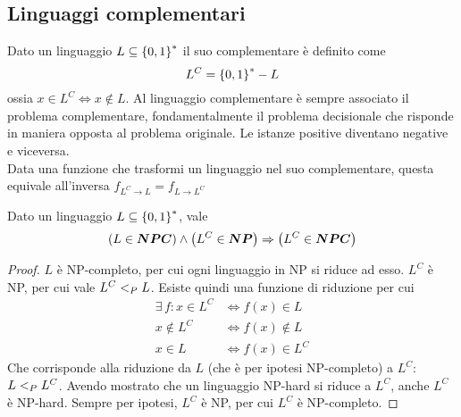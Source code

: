 \subsection{Linguaggi complementari}
\begin{definition}
    \label{def:linguaggiocomplementare}
    Dato un linguaggio $
    L \subseteq \left\{0,1\right\}^{*}
    $
    il suo complementare è definito come
    \begin{equation*}
        L^C = \left\{0,1\right\}^{*} - L
    \end{equation*}
    ossia
    $
        x \in L^C \Leftrightarrow x \notin L
    $.
    Al linguaggio complementare è sempre associato il problema complementare, fondamentalmente il problema decisionale che risponde in maniera opposta al problema originale. Le istanze positive diventano negative e viceversa.
    \\
    Data una funzione che trasformi un linguaggio nel suo complementare, questa equivale all'inversa
    $
        f_{L^C \to L}
        =
        f_{L \to L^C}
    $
\end{definition}

\begin{theorem}
    \label{teo:riduzionecomplementare}
    Dato un linguaggio $
    L \subseteq \left\{0,1\right\}^{*}
    $,
    vale
    \begin{equation*}
        \left( L \in \bm{NPC} \right)
        \wedge
        \left( L^C \in \bm{NP} \right)
        \Rightarrow
        \left( L^C \in \bm{NPC} \right)
    \end{equation*}
    \begin{proof}
        $L$ è NP-completo, per cui ogni linguaggio in NP si riduce ad esso. $L^C$ è NP, per cui vale $L^C <_P L$.
        Esiste quindi una funzione di riduzione per cui
        \begin{align*}
            \exists \, f :
            x \in L^C
            & \Leftrightarrow
            f(x) \in L
            \\
            x \notin L^C
            & \Leftrightarrow
            f(x) \notin L
            \\
            x \in L
            & \Leftrightarrow
            f(x) \in L^C
        \end{align*}
        Che corrisponde alla riduzione da $L$ (che è per ipotesi NP-completo) a $L^C$: $L <_P L^C$.
        Avendo mostrato che un linguaggio NP-hard si riduce a $L^C$, anche $L^C$ è NP-hard.
        Sempre per ipotesi, 
        $L^C$ è NP, per cui $L^C$ è NP-completo.
    \end{proof}
\end{theorem}

